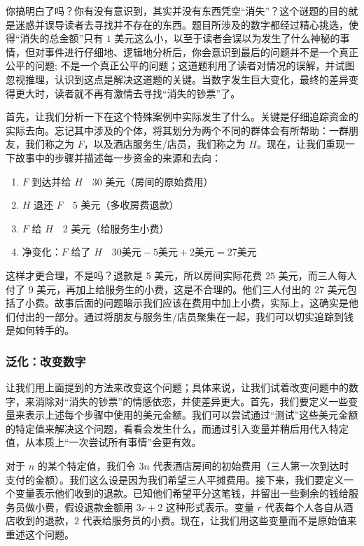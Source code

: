 你搞明白了吗？你有没有意识到，其实并没有东西凭空“消失”？这个谜题的目的就是迷惑并误导读者去寻找并不存在的东西。题目所涉及的数字都经过精心挑选，使得“消失的总金额”只有 $1$ 美元这么小，以至于读者会误以为发生了什么神秘的事情，但对事件进行仔细地、逻辑地分析后，你会意识到最后的问题并不是一个真正公平的问题; 不是一个真正公平的问题；这道题利用了读者对情况的误解，并试图忽视推理，认识到这点是解决这道题的关键。当数字发生巨大变化，最终的差异变得更大时，读者就不再有激情去寻找“消失的钞票”了。

首先，让我们分析一下在这个特殊案例中实际发生了什么。关键是仔细追踪资金的实际去向。忘记其中涉及的个体，将其划分为两个不同的群体会有所帮助：一群朋友，我们称之为 $F$，以及酒店服务生/店员，我们称之为 $H$。现在，让我们重现一下故事中的步骤并描述每一步资金的来源和去向：

\begin{enumerate}
    \item $F$ 到达并给 $H \quad 30$ 美元（房间的原始费用）
    \item $H$ 退还 $F \quad 5$ 美元（多收房费退款）
    \item $F$ 给 $H \quad 2$ 美元（给服务生小费）
    \item 净变化：$F$ 给了 $H \quad 30 \text{美元} -5 \text{美元} + 2 \text{美元} = 27 \text{美元}$
\end{enumerate}

这样才更合理，不是吗？退款是 $5$ 美元，所以房间实际花费 $25$ 美元，而三人每人付了 $9$ 美元，再加上给服务生的小费，这是不合理的。他们三人付出的 $27$ 美元包括了小费。故事后面的问题暗示我们应该在费用中加上小费，实际上，这确实是他们付出的一部分。通过将朋友与服务生/店员聚集在一起，我们可以切实追踪到钱是如何转手的。

\subsubsection*{泛化：改变数字}

让我们用上面提到的方法来改变这个问题；具体来说，让我们试着改变问题中的数字，来消除对“消失的钞票”的情感依恋，并使差异更大。首先，我们要定义一些变量来表示上述每个步骤中使用的美元金额。我们可以尝试通过“测试”这些美元金额的特定值来解决这个问题，看看会发生什么，而通过引入变量并稍后用代入特定值，从本质上“一次尝试所有事情”会更有效。

对于 $n$ 的某个特定值，我们令 $3n$ 代表酒店房间的初始费用（三人第一次到达时支付的金额）。我们这么设是因为我们希望三人平摊费用。接下来，我们要定义一个变量表示他们收到的退款。已知他们希望平分这笔钱，并留出一些剩余的钱给服务员做小费，假设退款金额用 $3r + 2$ 这种形式表示。变量 $r$ 代表每个人各自从酒店收到的退款，$2$ 代表给服务员的小费。现在，让我们用这些变量而不是原始值来重述这个问题。

